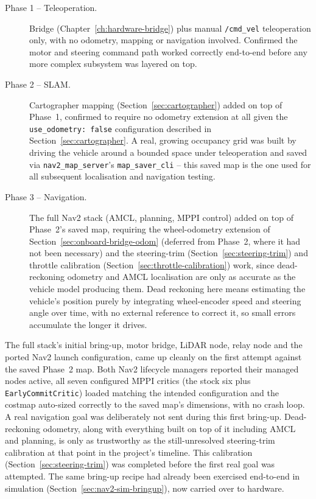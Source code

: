 \begin{description}
  \item[Phase 1 -- Teleoperation.] Bridge (Chapter~\ref{ch:hardware-bridge})
    plus manual \texttt{/cmd\_vel} teleoperation only, with no
    odometry, mapping or navigation involved. Confirmed the motor and
    steering command path worked correctly end-to-end before any more
    complex subsystem was layered on top.
  \item[Phase 2 -- SLAM.] Cartographer mapping
    (Section~\ref{sec:cartographer}) added on top of Phase~1,
    confirmed to require no odometry extension at all given the
    \texttt{use\_odometry: false} configuration described in
    Section~\ref{sec:cartographer}. A real, growing occupancy grid was
    built by driving the vehicle around a bounded space under
    teleoperation and saved via \texttt{nav2\_map\_server}'s
    \texttt{map\_saver\_cli} -- this saved map is the one used for all
    subsequent localisation and navigation testing.
  \item[Phase 3 -- Navigation.] The full Nav2 stack (AMCL, planning,
    MPPI control) added on top of Phase~2's saved map, requiring the
    wheel-odometry extension of Section~\ref{sec:onboard-bridge-odom}
    (deferred from Phase~2, where it had not been necessary) and the
    steering-trim (Section~\ref{sec:steering-trim}) and throttle
    calibration (Section~\ref{sec:throttle-calibration}) work, since
    dead-reckoning odometry and AMCL localisation are only as accurate
    as the vehicle model producing them. Dead reckoning here means
    estimating the vehicle's position purely by integrating
    wheel-encoder speed and steering angle over time, with no external
    reference to correct it, so small errors accumulate the longer it
    drives.
\end{description}

The full stack's initial bring-up, motor bridge, LiDAR node, relay
node and the ported Nav2 launch configuration, came up cleanly on
the first attempt against the saved Phase~2 map. Both Nav2 lifecycle
managers reported their managed nodes active, all seven configured
MPPI critics (the stock six plus \texttt{EarlyCommitCritic}) loaded
matching the intended configuration and the costmap auto-sized
correctly to the saved map's dimensions, with no crash loop. A real
navigation goal was deliberately not sent during this first bring-up.
Dead-reckoning odometry, along with everything built on top of it
including AMCL and planning, is only as trustworthy as the
still-unresolved steering-trim calibration at that point in the
project's timeline. This calibration (Section~\ref{sec:steering-trim})
was completed before the first real goal was attempted. The same
bring-up recipe had already been exercised end-to-end in simulation
(Section~\ref{sec:nav2-sim-bringup}), now carried over to hardware.

